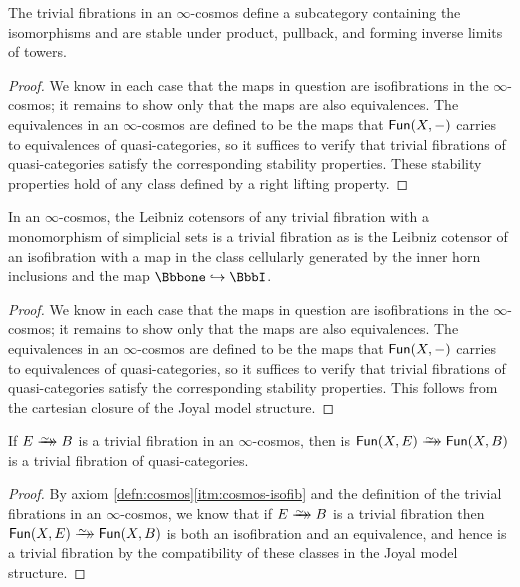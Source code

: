 \begin{lemma}\label{lem:trivial-fib-conical}
  The trivial fibrations in an $\infty$-cosmos define a subcategory containing the isomorphisms and are stable under product, pullback, and forming inverse limits of towers.
\end{lemma}
\begin{proof}
  We know in each case that the maps in question are isofibrations in the $\infty$-cosmos; it remains to show only that the maps are also equivalences. The equivalences in an $\infty$-cosmos are defined to be the maps that ${\mathord{\mathsf{Fun}}}(X,-)$ carries to equivalences of quasi-categories, so it suffices to verify that trivial fibrations of quasi-categories satisfy the corresponding stability properties. These stability properties hold of any class defined by a right lifting property.
\end{proof}



\begin{lemma}\label{lem:trivial-fib-leibniz}
  In an $\infty$-cosmos, the Leibniz cotensors of any trivial fibration with a monomorphism of simplicial sets is a trivial fibration as is the Leibniz cotensor of an isofibration with a map in the class cellularly generated by the inner horn inclusions and the map $\catone\inc\iso$.
\end{lemma}
\begin{proof}
We know in each case that the maps in question are isofibrations in the $\infty$-cosmos; it remains to show only that the maps are also equivalences. The equivalences in an $\infty$-cosmos are defined to be the maps that ${\mathord{\mathsf{Fun}}}(X,-)$ carries to equivalences of quasi-categories, so it suffices to verify that trivial fibrations of quasi-categories satisfy the corresponding stability properties. This follows from the cartesian closure of the Joyal model structure.
\end{proof}


\begin{lemma}\label{lem:trivial-fib-representability}
If $E \trvfib B$ is a trivial fibration in an $\infty$-cosmos, then is $\Fun(X,E)\trvfib\Fun(X,B)$ is a trivial fibration of quasi-categories.
\end{lemma}
\begin{proof}
By axiom \ref{defn:cosmos}\ref{itm:cosmos-isofib} and the definition of the trivial fibrations in an $\infty$-cosmos, we know that if $E \trvfib B$ is a trivial fibration then  $\Fun(X,E)\trvfib\Fun(X,B)$ is both an isofibration and an equivalence, and hence is a trivial fibration by the compatibility of these classes in the Joyal model structure.
\end{proof}


